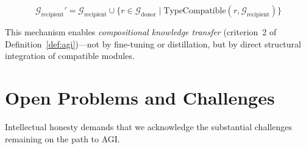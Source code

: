\begin{equation}
\mathcal{G}_{\text{recipient}}' = \mathcal{G}_{\text{recipient}} \cup \bigl\{ r \in \mathcal{G}_{\text{donor}} \;\big|\; \text{TypeCompatible}(r, \mathcal{G}_{\text{recipient}}) \bigr\}
\label{eq:hgt}
\end{equation}

This mechanism enables \emph{compositional knowledge transfer} (criterion~2 of Definition~\ref{def:agi})---not by fine-tuning or distillation, but by direct structural integration of compatible modules.

\section{Open Problems and Challenges}
\label{sec:open-problems}

Intellectual honesty demands that we acknowledge the substantial challenges remaining on the path to AGI.

